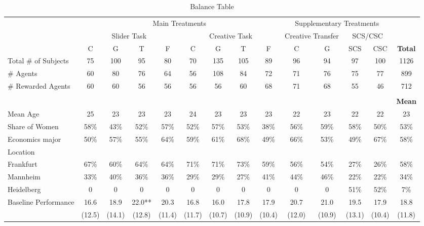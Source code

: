 
\begin{landscape}
\begin{table}\caption{Balance Table}
\begin{center}%
\begin{tabular}[t]{|l|c|c|c|c|c|c|c|c||c|c|c|c||c|} \cline{2-13}
 \multicolumn{1}{c|}{} & \multicolumn{8}{c||}{Main Treatments} &  \multicolumn{4}{|c||}{Supplementary Treatments} &\multicolumn{1}{c}{} \\
\cline{2-13}
 \multicolumn{1}{c|}{}& \multicolumn{4}{c}{Slider Task} &  \multicolumn{4}{|c||}{Creative Task} &  \multicolumn{2}{|c|}{Creative Transfer} &  \multicolumn{2}{|c||}{SCS/CSC} &\multicolumn{1}{c}{}\\
\cline{2-14}
\multicolumn{1}{c|}{} & C & G & T & F & C & G & T & F & C& G & SCS &CSC& \bf Total \\
\cline{2-14}\hline
Total \# of Subjects & 75 & 100 & 95 & 80 & 70 & 135 & 105 & 89 &  96 & 94 & 97 & 100 & 1126 \\
\# Agents  & 60 & 80 & 76 & 64 & 56 & 108  & 84 & 72  &71 & 76 &75&77&899 \\
\# Rewarded Agents & 60 & 60 & 56 & 56 & 56 & 56 & 60 & 68 &  71 & 68 & 55&46&712\\
 & & & & & & & & & & & & &\\
 & & & & & & & & &  & & & &\bf Mean  \\
Mean Age  & 25& 23& 23& 23&24 &23 &23 &23 & 22 & 23 &22&22&23  \\
Share of Women  & 58\% & 43\% & 52\% & 57\% & 52\%  & 57\%  & 53\%  & 38\% &56\% &59\% &58\% & 50\%& 53\% \\
Economics major & 50\% & 57\%& 55\%& 64\% & 59\%&61\% &68\% & 49\% &66\% &53\% &49\% &67\% & 58\% \\
Location & & & & & & & & & & & & & \\
\hspace{3mm} Frankfurt  & 67\% & 60\% & 64\% & 64\% & 71\% & 71\%& 73\%& 59\% & 56\% &54\% & 27\% &26\% &58\% \\
\hspace{3mm} Mannheim & 33\%& 40\% & 36\%& 36\% & 29\% & 29\%& 27\%& 41\% & 44\% & 46\% & 22\% &22\%& 34\% \\
\hspace{3mm} Heidelberg & 0& 0 & 0& 0 & 0 & 0& 0& 0 & 0 & 0 & 51\% &52\%&7\% \\
Baseline Performance & 16.6 & 18.9 & 22.0** & 20.3 &16.8  &16.0  &17.8  &17.9 & 20.7 & 21.0 & 19.5 & 17.9 & 18.8   \\
&(12.5)&(14.1)&(12.8)&(11.4)&(11.7)&(10.7)&(10.9)&(10.4)&(12.0)  & (10.9)  & (13.1) & (10.4)&(11.8)\\

\end{tabular}
\end{center}
\end{table}
\end{landscape}
